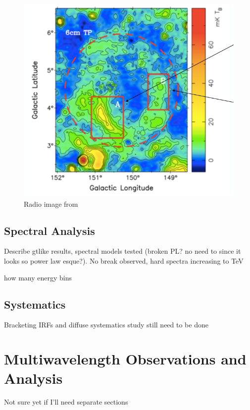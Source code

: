 \documentclass[preprint2]{aastex}
\begin{document}
\begin{figure}[!ht]
	\begin{centering}
		\includegraphics[width=\columnwidth]{Figures/G150_GaoHan.png}
		\caption{Radio image from \citep{Gao14}
			\label{fig:GaoRad}}
	\end{centering}
\end{figure}

\subsection{\label{sec:LATspec}Spectral Analysis}
Describe gtlike  results, spectral models tested (broken PL? no need to since it looks so power law esque?). No break observed, hard spectra increasing to TeV

how many energy bins
\subsection{\label{sec:LATsys}Systematics}
Bracketing IRFs and diffuse systematics study still need to be done


%
%

\section{\label{sec:Multiwave}Multiwavelength  Observations and  Analysis }
Not sure yet if I'll need separate sections
\end{document}
